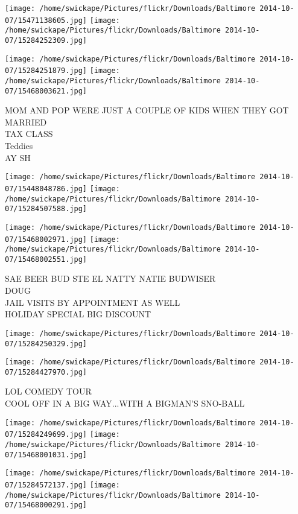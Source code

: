 \documentclass[10pt,letterpaper]{article}
\begin{document}
\texttt{[image: /home/swickape/Pictures/flickr/Downloads/Baltimore 2014-10-07/15471138605.jpg]}
\texttt{[image: /home/swickape/Pictures/flickr/Downloads/Baltimore 2014-10-07/15284252309.jpg]}

\texttt{[image: /home/swickape/Pictures/flickr/Downloads/Baltimore 2014-10-07/15284251879.jpg]}
\texttt{[image: /home/swickape/Pictures/flickr/Downloads/Baltimore 2014-10-07/15468003621.jpg]}

MOM AND POP WERE JUST A COUPLE OF KIDS WHEN THEY GOT MARRIED\\
TAX CLASS\\
Teddies\\
AY SH
\pagebreak

\texttt{[image: /home/swickape/Pictures/flickr/Downloads/Baltimore 2014-10-07/15448048786.jpg]}
\texttt{[image: /home/swickape/Pictures/flickr/Downloads/Baltimore 2014-10-07/15284507588.jpg]}

\texttt{[image: /home/swickape/Pictures/flickr/Downloads/Baltimore 2014-10-07/15468002971.jpg]}
\texttt{[image: /home/swickape/Pictures/flickr/Downloads/Baltimore 2014-10-07/15468002551.jpg]}

SAE BEER BUD STE EL NATTY NATIE BUDWISER\\
DOUG\\
JAIL VISITS BY APPOINTMENT AS WELL\\
HOLIDAY SPECIAL BIG DISCOUNT
\pagebreak

\texttt{[image: /home/swickape/Pictures/flickr/Downloads/Baltimore 2014-10-07/15284250329.jpg]}

\vspace{0.25in}
\texttt{[image: /home/swickape/Pictures/flickr/Downloads/Baltimore 2014-10-07/15284427970.jpg]}

LOL COMEDY TOUR\\
COOL OFF IN A BIG WAY...WITH A BIGMAN'S SNO{-}BALL
\pagebreak

\texttt{[image: /home/swickape/Pictures/flickr/Downloads/Baltimore 2014-10-07/15284249699.jpg]}
\texttt{[image: /home/swickape/Pictures/flickr/Downloads/Baltimore 2014-10-07/15468001031.jpg]}

\texttt{[image: /home/swickape/Pictures/flickr/Downloads/Baltimore 2014-10-07/15284572137.jpg]}
\texttt{[image: /home/swickape/Pictures/flickr/Downloads/Baltimore 2014-10-07/15468000291.jpg]}
\end{document}
